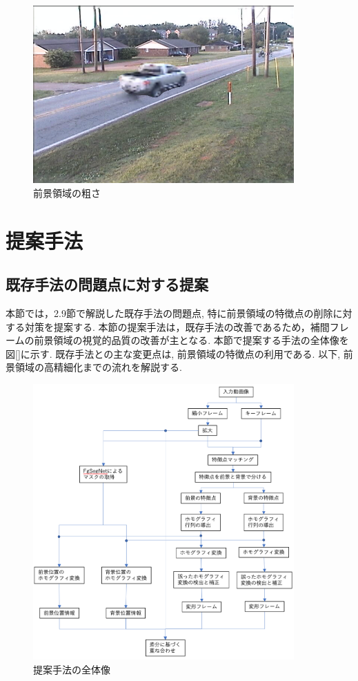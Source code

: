 \documentclass[a4paper,12pt]{jsreport}
\begin{document}
\begin{figure}[h]
  \begin{center}
    \includegraphics[width=10cm]{./ukihashi_method.bmp}
    \caption{前景領域の粗さ}
  \end{center}
\end{figure}




\chapter{提案手法}

\section{既存手法の問題点に対する提案}

本節では，2.9節で解説した既存手法の問題点, 特に前景領域の特徴点の削除に対する対策を提案する. 本節の提案手法は，既存手法の改善であるため，補間フレームの前景領域の視覚的品質の改善が主となる. 本節で提案する手法の全体像を図[]に示す. 既存手法との主な変更点は, 前景領域の特徴点の利用である. 以下, 前景領域の高精細化までの流れを解説する.

\begin{figure}[h]
  \begin{center}
    \includegraphics[width=10cm]{./zentaizou.png}
    \caption{提案手法の全体像}
  \end{center}
\end{figure}
\end{document}
